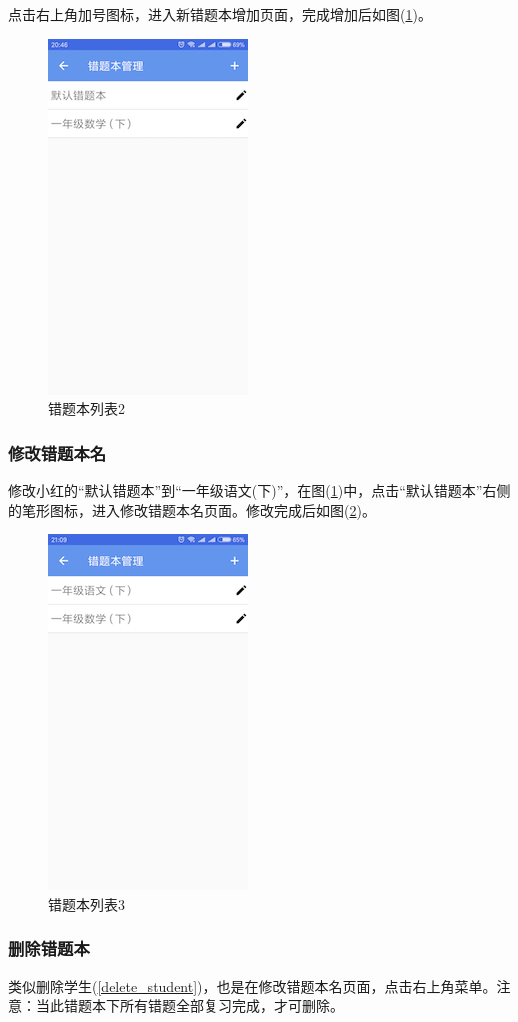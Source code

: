 点击右上角加号图标，进入新错题本增加页面，完成增加后如图(\ref{img16})。
\begin{figure}[H]
	\centering
	\includegraphics{img/16.png}
	\caption{错题本列表2}
	\label{img16}
\end{figure}

\subsubsection{修改错题本名}
修改小红的“默认错题本”到“一年级语文(下)”，在图(\ref{img16})中，点击“默认错题本”右侧的笔形图标，进入修改错题本名页面。修改完成后如图(\ref{img17})。
\begin{figure}[H]
	\centering
	\includegraphics{img/17.png}
	\caption{错题本列表3}
	\label{img17}
\end{figure}

\subsubsection{删除错题本}
类似删除学生(\ref{delete_student})，也是在修改错题本名页面，点击右上角菜单。注意：当此错题本下所有错题全部复习完成，才可删除。